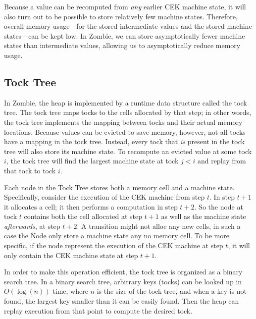 Because a value can be recomputed from \emph{any} earlier CEK machine state, it will also turn out to be possible to store relatively few machine states. Therefore, overall memory usage---for the stored intermediate values and the stored machine states---can be kept low. In Zombie, we can store asymptotically fewer machine states than intermediate values, allowing us to asymptotically reduce memory usage.

\subsection{Tock Tree}
In Zombie, the heap is implemented by a runtime data structure called the tock tree. The tock tree maps tocks to the cells allocated by that step; in other words, the tock tree implements the mapping between tocks and their actual memory locations. Because values can be evicted to save memory, however, not all tocks have a mapping in the tock tree. Instead, every tock that \emph{is} present in the tock tree will also store its machine state. To recompute an evicted value at some tock $i$, the tock tree will find the largest machine state at tock $j < i$ and replay from that tock to tock $i$.

Each node in the Tock Tree stores both a memory cell and a machine state. Specifically, consider the execution of the CEK machine from step $t$. In step $t + 1$ it allocates a cell; it then performs a computation in step $t + 2$. So the node at tock $t$ contains both the cell allocated at step $t + 1$ as well as the machine state \emph{afterwards}, at step $t + 2$. A transition might not alloc any new cells, in such a case the Node only store a machine state any no memory cell. To be more specific, if the node represent the execution of the CEK machine at step $t$, it will only contain the CEK machine state at step $t + 1$.

In order to make this operation efficient, the tock tree is organized as a binary search tree. In a binary search tree, arbitrary keys (tocks) can be looked up in $O(\log(n))$ time, where $n$ is the size of the tock tree, and when a key is not found, the largest key smaller than it can be easily found. Then the heap can replay execution from that point to compute the desired tock.


